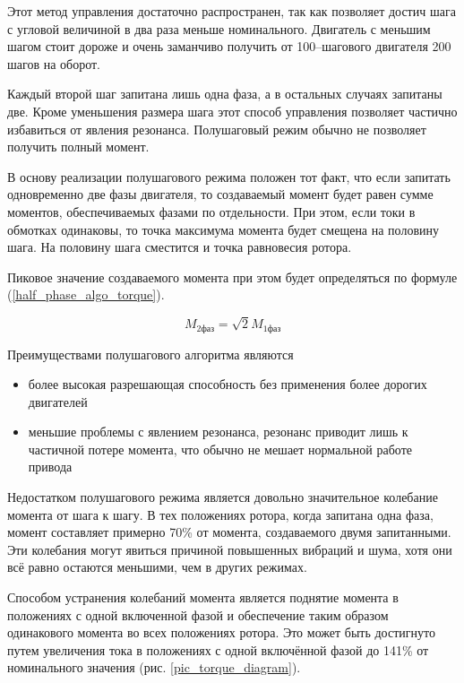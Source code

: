 Этот метод управления достаточно распространен, так как позволяет достич шага с
угловой величиной в два раза меньше номинального. Двигатель с меньшим шагом стоит
дороже и очень заманчиво получить от 100--шагового двигателя 200 шагов на оборот.

Каждый второй шаг запитана лишь одна фаза, а в остальных случаях запитаны две.
Кроме уменьшения размера шага этот способ управления позволяет частично избавиться
от явления резонанса. Полушаговый режим обычно не позволяет получить полный момент.

В основу реализации полушагового режима положен тот факт, что если запитать
одновременно две фазы двигателя, то создаваемый момент будет равен
сумме моментов, обеспечиваемых фазами по отдельности. При этом, если токи в
обмотках одинаковы, то точка максимума момента будет смещена на половину шага.
На половину шага сместится и точка равновесия ротора.

Пиковое значение создаваемого момента при этом будет определяться по формуле
(\ref{half_phase_algo_torque}).

\begin{equation}
    M_\textit{2фаз} = \sqrt{2} M_\textit{1фаз}
    \label{half_phase_algo_torque}
\end{equation}

Преимуществами полушагового алгоритма являются
\begin{itemize}
    \item более высокая разрешающая способность без применения более дорогих
        двигателей
    \item меньшие проблемы с явлением резонанса, резонанс приводит лишь к частичной
        потере момента, что обычно не мешает нормальной работе привода
\end{itemize}

Недостатком полушагового режима является довольно значительное колебание момента от
шага к шагу. В тех положениях ротора, когда запитана одна фаза, момент составляет
примерно 70\% от момента, создаваемого двумя запитанными. Эти колебания могут
явиться причиной повышенных вибраций и шума, хотя они всё равно остаются меньшими,
чем в других режимах.

Способом устранения колебаний момента является поднятие момента в
положениях с одной включенной фазой и обеспечение таким образом одинакового момента
во всех положениях ротора. Это может быть достигнуто путем увеличения тока в
положениях с одной включённой фазой до 141\% от номинального значения
(рис. \ref{pic_torque_diagram}).

